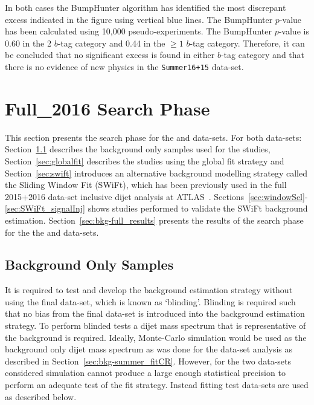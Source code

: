 In both cases the BumpHunter algorithm has identified the most discrepant excess indicated
in the figure using vertical blue lines.
The BumpHunter \mbox{$p$-value} has been calculated using 10,000 pseudo-experiments.
The BumpHunter \mbox{$p$-value} is 0.60 in the 2 $b$-tag category
and 0.44 in the $\geq1$ $b$-tag category.
Therefore, it can be concluded that no significant excess is found in either $b$-tag category
and that there is no evidence of new physics in the \verb|Summer16+15| data-set.

\section{Full\_2016 Search Phase}
\label{sec:bkg-full}

This section presents the search phase for the \hm{} and \lm{} data-sets.
For both data-sets:
Section~\ref{sec:stat:bkgsample} describes the background only samples used for the studies,
Section~\ref{sec:globalfit} describes the studies using the global fit strategy and
Section~\ref{sec:swift} introduces an alternative background modelling strategy called the Sliding Window Fit (SWiFt),
which has been previously used in the full 2015+2016 data-set inclusive dijet analysis at ATLAS~\cite{dijet_mori17_paper}.
Sections~\ref{sec:windowSel}-\ref{sec:SWiFt_signalInj} shows studies performed to validate the SWiFt background estimation.
Section~\ref{sec:bkg-full_results} presents the results of the search phase
for the the \hm{} and \lm{} data-sets.

\subsection{Background Only Samples}
\label{sec:stat:bkgsample}

It is required to test and develop the background estimation strategy without using the final data-set, which is known as `blinding'.
Blinding is required such that no bias from the final data-set is introduced into the background estimation strategy.
To perform blinded tests a dijet mass spectrum that is representative of the background is required.
Ideally, Monte-Carlo simulation would be used as the background only dijet mass spectrum
as was done for the \summer{} data-set analysis as described in Section~\ref{sec:bkg-summer_fitCR}.
However, for the two data-sets considered simulation cannot produce a large enough statistical precision to perform an adequate test of the fit strategy.
Instead fitting test data-sets are used as described below.

